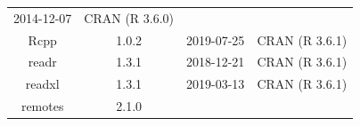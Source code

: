 \documentclass[11pt,]{book}
\begin{document}
\begin{longtable}[]{@{}cccc@{}}
\begin{minipage}[t]{0.16\columnwidth}
2014-12-07\strut
\end{minipage} & \begin{minipage}[t]{0.36\columnwidth}\centering\strut
CRAN (R 3.6.0)\strut
\end{minipage}\tabularnewline
\begin{minipage}[t]{0.18\columnwidth}\centering\strut
Rcpp\strut
\end{minipage} & \begin{minipage}[t]{0.19\columnwidth}\centering\strut
1.0.2\strut
\end{minipage} & \begin{minipage}[t]{0.16\columnwidth}\centering\strut
2019-07-25\strut
\end{minipage} & \begin{minipage}[t]{0.36\columnwidth}\centering\strut
CRAN (R 3.6.1)\strut
\end{minipage}\tabularnewline
\begin{minipage}[t]{0.18\columnwidth}\centering\strut
readr\strut
\end{minipage} & \begin{minipage}[t]{0.19\columnwidth}\centering\strut
1.3.1\strut
\end{minipage} & \begin{minipage}[t]{0.16\columnwidth}\centering\strut
2018-12-21\strut
\end{minipage} & \begin{minipage}[t]{0.36\columnwidth}\centering\strut
CRAN (R 3.6.1)\strut
\end{minipage}\tabularnewline
\begin{minipage}[t]{0.18\columnwidth}\centering\strut
readxl\strut
\end{minipage} & \begin{minipage}[t]{0.19\columnwidth}\centering\strut
1.3.1\strut
\end{minipage} & \begin{minipage}[t]{0.16\columnwidth}\centering\strut
2019-03-13\strut
\end{minipage} & \begin{minipage}[t]{0.36\columnwidth}\centering\strut
CRAN (R 3.6.1)\strut
\end{minipage}\tabularnewline
\begin{minipage}[t]{0.18\columnwidth}\centering\strut
remotes\strut
\end{minipage} & \begin{minipage}[t]{0.19\columnwidth}\centering\strut
2.1.0\strut
\end{minipage} & \begin{minipage}[t]{0.16\columnwidth}\centering\strut

\end{minipage}
\end{longtable}
\end{document}
